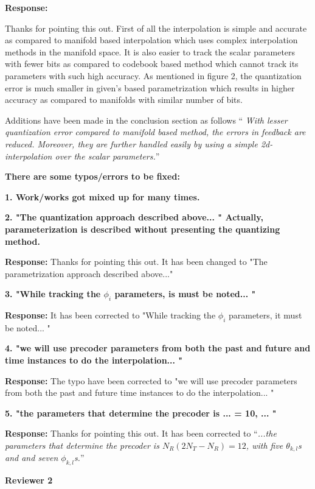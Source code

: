 \documentclass[12pt]{letter}
\begin{document}
\textbf{Response:}

Thanks for pointing this out.
First of all the interpolation is simple and accurate as compared to manifold based interpolation which uses complex interpolation methods in the manifold space. It is also easier to track the scalar parameters with fewer bits as compared to codebook based method which cannot track its parameters with such high accuracy. As mentioned in figure 2, the quantization error is much smaller in given's based parametrization which results in higher accuracy as compared to manifolds with similar number of bits.

Additions have been made in the conclusion section as follows `` \emph{With lesser quantization error compared to manifold based method, the 
errors in feedback are reduced. Moreover, they are further 
handled easily by using a simple 2d-interpolation over the scalar parameters.}''


\textbf{There are some typos/errors to be fixed:}

\textbf{1. Work/works got mixed up for many times.}

\textbf{2. "The quantization approach described above... " Actually,
  parameterization is described without presenting the quantizing
  method.}

\textbf{Response:} Thanks for pointing this out. It has been changed to "The parametrization approach described above..."

\textbf{3. "While tracking the $\phi_i$ parameters, is must be noted... "}

\textbf{Response:} It has been corrected to "While tracking the $\phi_i$ parameters, it must be noted... "

\textbf{4. "we will use precoder parameters from both the past and future and
time instances to do the interpolation... "}

\textbf{Response:} The typo have been corrected to "we will use precoder parameters from both the past and future
time instances to do the interpolation... "

\textbf{5. "the parameters that determine the precoder is ...  = 10, ... "}

\textbf{Response:} Thanks for pointing this out. It has been corrected to ``\emph{...the parameters that determine the precoder is
$N_{R}(2N_{T} - N_R) = 12$, with five $\theta_{k,l}$s and and seven
$\phi_{k,l}$s.}''

\textbf{Reviewer 2}\\
\end{document}
